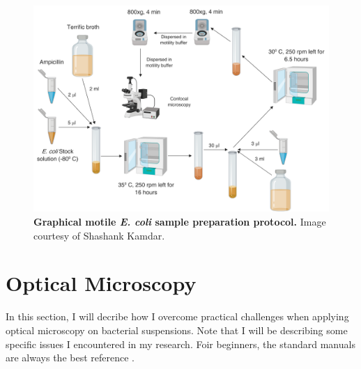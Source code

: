 \begin{figure}[ht]
	\begin{center}
	\includegraphics[width=5.5 in]{Figs/2-Exp/2.pdf}
	\end{center}
	\caption[Graphical motile \textit{E. coli} sample preparation protocol]
	{
	\textbf{Graphical motile \textit{E. coli} sample preparation protocol.}
	Image courtesy of Shashank Kamdar.
	}
	\label{fig:2-2}
\end{figure}





\section{Optical Microscopy}
\label{sec:optical-microscopy}

In this section, I will decribe how I overcome practical challenges when applying optical microscopy on bacterial suspensions. Note that I will be describing some specific issues I encountered in my research. Foir beginners, the standard manuals are always the best reference \cite{NikonTiEManual}.

